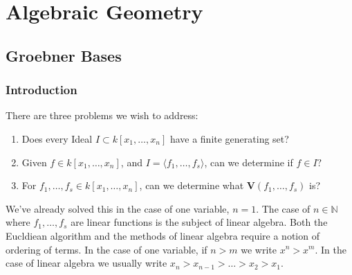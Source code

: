 \documentclass[crop=false,class=article,oneside]{standalone}
\begin{document}
    \ifx\ifsub\undefined
        \section*{Algebraic Geometry}
        \setcounter{section}{1}
    \fi
    \subsection{Groebner Bases}
        \subsubsection{Introduction}
            There are three problems we wish to address:
            \begin{enumerate}
                \item Does every Ideal
                      $I\subset k[x_1,\hdots ,x_n]$
                      have a finite generating set?
                \item Given $f\in k[x_1,\hdots ,x_n]$,
                      and $I=\langle f_1,\hdots, f_s\rangle$,
                      can we determine if $f\in I?$
                \item For $f_1,\hdots,f_{s}\in{k}[x_{1},\hdots,x_{n}]$,
                      can we determine what
                      $\mathbf{V}(f_1,\hdots, f_s)$ is?
            \end{enumerate}
            We've already solved this in the case of one
            variable, $n=1$. The case of $n\in\mathbb{N}$
            where $f_1,\hdots,f_s$ are linear functions is the
            subject of linear algebra. Both the Eucldiean
            algorithm and the methods of linear algebra require
            a notion of ordering of terms. In the case of one
            variable, if $n>m$ we write $x^n>x^m$. In the case of
            linear algebra we usually write
            $x_n>x_{n-1}>\hdots>x_{2}>x_{1}$. 
\end{document}
